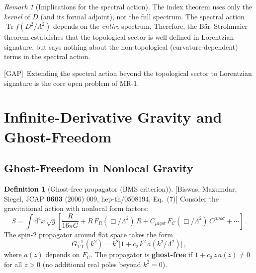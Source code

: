 \documentclass[12pt,a4paper]{article}
\theoremstyle{definition}
\newtheorem{definition}[proposition]{Definition}
\theoremstyle{remark}
\newtheorem{remark}[proposition]{Remark}
\newcommand{\Tr}{\operatorname{Tr}}
\newcommand{\dd}{\mathrm{d}}
\newcommand{\fromlit}[1]{\textcolor{blue!70!black}{\textsf{[#1]}}}
\newcommand{\gap}{\textcolor{red!80!black}{\textsf{[GAP]}}}
\begin{document}
\begin{remark}[Implications for the spectral action]
\label{rem:index-spectral-action}
The index theorem uses only the \emph{kernel} of $D$ (and its formal
adjoint), not the full spectrum.  The spectral action
$\Tr f(D^2/\Lambda^2)$ depends on the \emph{entire} spectrum.
Therefore, the B\"{a}r--Strohmaier theorem establishes that the
topological sector is well-defined in Lorentzian signature, but says
nothing about the non-topological (curvature-dependent) terms in the
spectral action.

\gap\ Extending the spectral action beyond the topological sector to
Lorentzian signature is the core open problem of MR-1.
\end{remark}


\section{Infinite-Derivative Gravity and Ghost-Freedom}
\label{sec:ghost-free}

\subsection{Ghost-Freedom in Nonlocal Gravity}

\begin{definition}[Ghost-free propagator (BMS criterion)]
\label{def:ghost-free-bms}
\fromlit{Biswas, Mazumdar, Siegel, JCAP \textbf{0603} (2006) 009,
hep-th/0508194, Eq.~(7)}
Consider the gravitational action with nonlocal form factors:
\begin{equation}\label{eq:idg-action}
  S = \int \dd^4 x\,\sqrt{g}\left[
    \frac{R}{16\pi G}
    + R\,F_R(\Box/\Lambda^2)\,R
    + C_{\mu\nu\rho\sigma}\,F_C(\Box/\Lambda^2)\,C^{\mu\nu\rho\sigma}
    + \cdots\right]\,.
\end{equation}
The spin-2 propagator around flat space takes the form
\begin{equation}\label{eq:idg-prop}
  G^{-1}_{\mathrm{TT}}(k^2)
  = k^2\bigl[1 + c_2\, k^2 \,a(k^2/\Lambda^2)\bigr]\,,
\end{equation}
where $a(z)$ depends on $F_C$.  The propagator is
\textbf{ghost-free} if $1 + c_2\, z\, a(z) \neq 0$ for all $z > 0$
(no additional real poles beyond $k^2 = 0$).
\end{definition}
\end{document}
